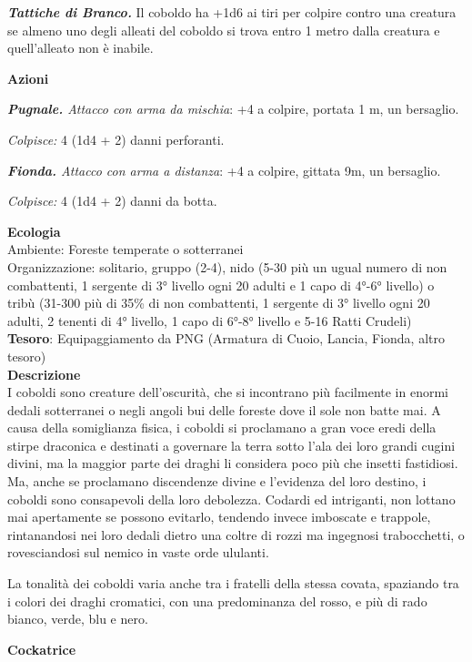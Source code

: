 \begin{multicols}{2}
	\textit{\textbf{Tattiche di Branco.}} Il coboldo ha +1d6 ai tiri per colpire contro una creatura se almeno uno degli alleati del coboldo si trova entro 1 metro dalla creatura e quell'alleato non è inabile.

	\textbf{Azioni}

	\textit{\textbf{Pugnale.} Attacco con arma da mischia}: +4 a colpire, portata 1 m, un bersaglio.

	\textit{Colpisce:} 4 (1d4 + 2) danni perforanti.

	\textit{\textbf{Fionda.} Attacco con arma a distanza}: +4 a colpire, gittata 9m, un bersaglio.

	\textit{Colpisce:} 4 (1d4 + 2) danni da botta.

	\textbf{Ecologia}\\
	Ambiente: Foreste temperate o sotterranei\\
	Organizzazione: solitario, gruppo (2-4), nido (5-30 più un ugual numero di non combattenti, 1 sergente di 3° livello ogni 20 adulti e 1 capo di 4°-6° livello) o tribù (31-300 più di 35\% di non combattenti, 1 sergente di 3° livello ogni 20 adulti, 2 tenenti di 4° livello, 1 capo di 6°-8° livello e 5-16 Ratti Crudeli)\\
	\textbf{Tesoro}: Equipaggiamento da PNG (Armatura di Cuoio, Lancia, Fionda, altro tesoro)\\
	\textbf{Descrizione}\\
	I coboldi sono creature dell'oscurità, che si incontrano più facilmente in enormi dedali sotterranei o negli angoli bui delle foreste dove il sole non batte mai. A causa della somiglianza fisica, i coboldi si proclamano a gran voce eredi della stirpe draconica e destinati a governare la terra sotto l'ala dei loro grandi cugini divini, ma la maggior parte dei draghi li considera poco più che insetti fastidiosi. Ma, anche se proclamano discendenze divine e l'evidenza del loro destino, i coboldi sono consapevoli della loro debolezza. Codardi ed intriganti, non lottano mai apertamente se possono evitarlo, tendendo invece imboscate e trappole, rintanandosi nei loro dedali dietro una coltre di rozzi ma ingegnosi trabocchetti, o rovesciandosi sul nemico in vaste orde ululanti.

	La tonalità dei coboldi varia anche tra i fratelli della stessa covata, spaziando tra i colori dei draghi cromatici, con una predominanza del rosso, e più di rado bianco, verde, blu e nero.

	\medskip{}\textbf{Cockatrice}


\end{multicols}
